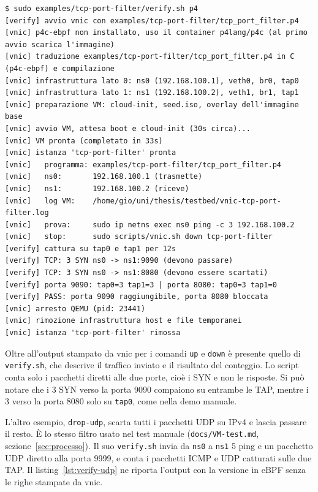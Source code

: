 \noindent\begin{minipage}{\linewidth}
\begin{lstlisting}[style=terminale, caption={Output di \texttt{verify.sh} per l'esempio \texttt{tcp-port-filter}, versione in P4}, label={lst:verify-tcp}]
$ sudo examples/tcp-port-filter/verify.sh p4
[verify] avvio vnic con examples/tcp-port-filter/tcp_port_filter.p4
[vnic] p4c-ebpf non installato, uso il container p4lang/p4c (al primo avvio scarica l'immagine)
[vnic] traduzione examples/tcp-port-filter/tcp_port_filter.p4 in C (p4c-ebpf) e compilazione
[vnic] infrastruttura lato 0: ns0 (192.168.100.1), veth0, br0, tap0
[vnic] infrastruttura lato 1: ns1 (192.168.100.2), veth1, br1, tap1
[vnic] preparazione VM: cloud-init, seed.iso, overlay dell'immagine base
[vnic] avvio VM, attesa boot e cloud-init (30s circa)...
[vnic] VM pronta (completato in 33s)
[vnic] istanza 'tcp-port-filter' pronta
[vnic]   programma: examples/tcp-port-filter/tcp_port_filter.p4
[vnic]   ns0:       192.168.100.1 (trasmette)
[vnic]   ns1:       192.168.100.2 (riceve)
[vnic]   log VM:    /home/gio/uni/thesis/testbed/vnic-tcp-port-filter.log
[vnic]   prova:     sudo ip netns exec ns0 ping -c 3 192.168.100.2
[vnic]   stop:      sudo scripts/vnic.sh down tcp-port-filter
[verify] cattura su tap0 e tap1 per 12s
[verify] TCP: 3 SYN ns0 -> ns1:9090 (devono passare)
[verify] TCP: 3 SYN ns0 -> ns1:8080 (devono essere scartati)
[verify] porta 9090: tap0=3 tap1=3 | porta 8080: tap0=3 tap1=0
[verify] PASS: porta 9090 raggiungibile, porta 8080 bloccata
[vnic] arresto QEMU (pid: 23441)
[vnic] rimozione infrastruttura host e file temporanei
[vnic] istanza 'tcp-port-filter' rimossa
\end{lstlisting}
\end{minipage}

Oltre all'output stampato da vnic per i comandi \texttt{up} e \texttt{down} è presente quello di \texttt{verify.sh}, che descrive il traffico inviato e il risultato del conteggio. Lo script conta solo i pacchetti diretti alle due porte, cioè i SYN e non le risposte. Si può notare che i 3 SYN verso la porta 9090 compaiono su entrambe le TAP, mentre i 3 verso la porta 8080 solo su \texttt{tap0}, come nella demo manuale.

L'altro esempio, \texttt{drop-udp}, scarta tutti i pacchetti UDP su IPv4 e lascia passare il resto. È lo stesso filtro usato nel test manuale (\texttt{docs/VM-test.md}, sezione~\ref{sec:processo}). Il suo \texttt{verify.sh} invia da \texttt{ns0} a \texttt{ns1} 5 ping e un pacchetto UDP diretto alla porta 9999, e conta i pacchetti ICMP e UDP catturati sulle due TAP. Il listing~\ref{lst:verify-udp} ne riporta l'output con la versione in eBPF senza le righe stampate da vnic.

